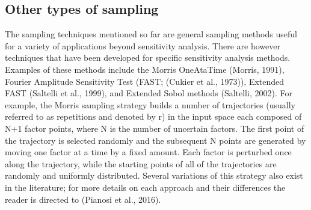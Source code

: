 \documentclass[letterpaper,10pt,english]{sphinxmanual}
\begin{document}
\subsection{Other types of sampling}
\label{\detokenize{3_sensitivity_analysis_the_basics:other-types-of-sampling}}
\sphinxAtStartPar
The sampling techniques mentioned so far are general sampling methods useful for a variety of applications beyond sensitivity analysis. There are however techniques that have been developed for specific sensitivity analysis methods. Examples of these methods include the Morris One\sphinxhyphen{}At\sphinxhyphen{}a\sphinxhyphen{}Time (Morris, 1991), Fourier Amplitude Sensitivity Test (FAST; (Cukier et al., 1973)), Extended FAST (Saltelli et al., 1999), and Extended Sobol methods (Saltelli, 2002). For example, the Morris sampling strategy builds a number of trajectories (usually referred to as repetitions and denoted by r) in the input space each composed of N+1 factor points, where N is the number of uncertain factors. The first point of the trajectory is selected randomly and the subsequent N points are generated by moving one factor at a time by a fixed amount. Each factor is perturbed once along the trajectory, while the starting points of all of the trajectories are randomly and uniformly distributed. Several variations of this strategy also exist in the literature; for more details on each approach and their differences the reader is directed to (Pianosi et al., 2016).
\end{document}
